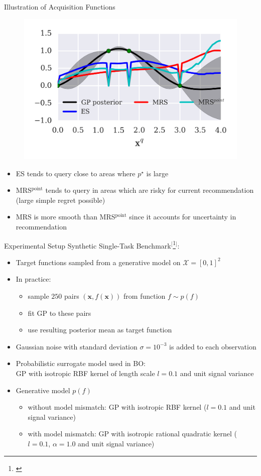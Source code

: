 \documentclass[11pt]{beamer}
\newcommand{\footcite}[1]{$^[$\footnote{\begin{tiny}\bibentry{#1}\end{tiny}}$^]$}
\begin{document}
\begin{frame}{Illustration of Acquisition Functions}
\begin{figure}
\centering
\includegraphics[width=0.48\columnwidth]{../pics/acq_comparison_2}
\end{figure}

\vspace*{-.5cm}
\begin{itemize}
\item ES tends to query close to areas where $p^\star$ is large
\item MRS$^\text{point}$ tends to query in areas which are risky for current recommendation (large simple regret possible)
\item MRS is more smooth than MRS$^\text{point}$ since it accounts for uncertainty in recommendation
\end{itemize}

\end{frame}


\begin{frame}{Experimental Setup}
Synthetic Single-Task Benchmark\footcite{hennig_entropy_2012}:
\begin{itemize}
 \item Target functions sampled from a generative model on $\mathcal{X} = [0, 1]^2$ 
 \item In practice: 
   \begin{itemize} 
   \item sample $250$ pairs $(\mathbf{x}, f(\mathbf{x}))$ from function $f \sim p(f)$
   \item fit GP to these pairs
   \item use resulting posterior mean as target function
   \end{itemize}
 \item Gaussian noise with standard deviation $\sigma =10^{-3}$ is added to each observation
 \item Probabilistic surrogate model used in BO:\\ GP with isotropic RBF kernel of length scale $l = 0.1$ and unit signal variance
 \pause
 \item Generative model $p(f)$
    \begin{itemize} 
    \item without model mismatch: GP with isotropic RBF kernel ($l = 0.1$ and unit signal variance)
    \item with model mismatch:  GP with isotropic rational quadratic kernel ($l = 0.1$, $\alpha=1.0$ and unit signal variance)
    \end{itemize}
\end{itemize}
\end{frame}
\end{document}
